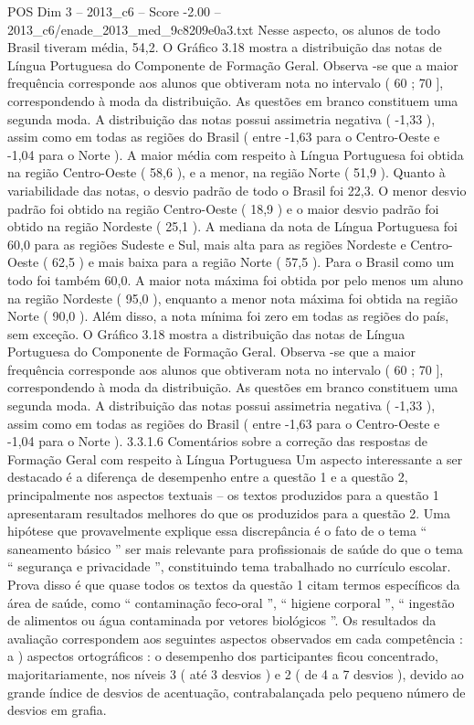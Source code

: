 \begin{textsample}{POS Dim 3 – 2013\_c6 – Score -2.00 – 2013\_c6/enade\_2013\_med\_9c8209e0a3.txt}
Nesse aspecto, os alunos de todo Brasil tiveram média, 54,2.
O Gráfico 3.18 mostra a distribuição das notas de Língua Portuguesa do Componente de Formação Geral.
Observa -se que a maior frequência corresponde aos alunos que obtiveram nota no intervalo ( 60 ; 70 ], correspondendo à moda da distribuição.
As questões em branco constituem uma segunda moda.
A distribuição das notas possui assimetria negativa ( -1,33 ), assim como em todas as regiões do Brasil ( entre -1,63 para o Centro-Oeste e -1,04 para o Norte ).
A maior média com respeito à Língua Portuguesa foi obtida na região Centro-Oeste ( 58,6 ), e a menor, na região Norte ( 51,9 ).
Quanto à variabilidade das notas, o desvio padrão de todo o Brasil foi 22,3.
O menor desvio padrão foi obtido na região Centro-Oeste ( 18,9 ) e o maior desvio padrão foi obtido na região Nordeste ( 25,1 ).
A mediana da nota de Língua Portuguesa foi 60,0 para as regiões Sudeste e Sul, mais alta para as regiões Nordeste e Centro-Oeste ( 62,5 ) e mais baixa para a região Norte ( 57,5 ).
Para o Brasil como um todo foi também 60,0.
A maior nota máxima foi obtida por pelo menos um aluno na região Nordeste ( 95,0 ), enquanto a menor nota máxima foi obtida na região Norte ( 90,0 ).
Além disso, a nota mínima foi zero em todas as regiões do país, sem exceção.
O Gráfico 3.18 mostra a distribuição das notas de Língua Portuguesa do Componente de Formação Geral.
Observa -se que a maior frequência corresponde aos alunos que obtiveram nota no intervalo ( 60 ; 70 ], correspondendo à moda da distribuição.
As questões em branco constituem uma segunda moda.
A distribuição das notas possui assimetria negativa ( -1,33 ), assim como em todas as regiões do Brasil ( entre -1,63 para o Centro-Oeste e -1,04 para o Norte ). 3.3.1.6 Comentários sobre a correção das respostas de Formação Geral com respeito à Língua Portuguesa Um aspecto interessante a ser destacado é a diferença de desempenho entre a questão 1 e a questão 2, principalmente nos aspectos textuais – os textos produzidos para a questão 1 apresentaram resultados melhores do que os produzidos para a questão 2.
Uma hipótese que provavelmente explique essa discrepância é o fato de o tema “ saneamento básico ” ser mais relevante para profissionais de saúde do que o tema “ segurança e privacidade ”, constituindo tema trabalhado no currículo escolar.
Prova disso é que quase todos os textos da questão 1 citam termos específicos da área de saúde, como “ contaminação feco-oral ”, “ higiene corporal ”, “ ingestão de alimentos ou água contaminada por vetores biológicos ”.
Os resultados da avaliação correspondem aos seguintes aspectos observados em cada competência : a ) aspectos ortográficos : o desempenho dos participantes ficou concentrado, majoritariamente, nos níveis 3 ( até 3 desvios ) e 2 ( de 4 a 7 desvios ), devido ao grande índice de desvios de acentuação, contrabalançada pelo pequeno número de desvios em grafia.

\end{textsample}
